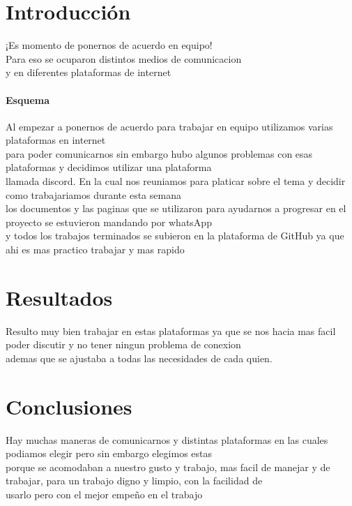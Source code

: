 \documentclass[12pt]{article}
\begin{document}
\maketitle


\section{Introducción}
¡Es momento de ponernos de acuerdo en equipo!\\
Para eso se ocuparon distintos medios de comunicacion\\
y en diferentes plataformas de internet\\

\paragraph{Esquema}
Al empezar a ponernos de acuerdo para trabajar en equipo utilizamos varias plataformas en internet\\
para poder comunicarnos sin embargo hubo algunos problemas con esas plataformas y decidimos utilizar una plataforma\\
llamada discord. En la cual nos reuniamos para platicar sobre el tema y decidir como trabajariamos durante esta semana\\
los documentos y las paginas que se utilizaron para ayudarnos a progresar en el proyecto se estuvieron mandando por whatsApp\\
y todos los trabajos terminados se subieron en la plataforma de GitHub ya que ahi es mas practico trabajar y mas rapido\\

\section{Resultados} \label{resultados}
Resulto muy bien trabajar en estas plataformas ya que se nos hacia mas facil poder discutir y no tener ningun problema de conexion\\ ademas que se ajustaba a todas las necesidades de cada quien.\\

\section{Conclusiones} \label{conclusiones}
Hay muchas maneras de comunicarnos y distintas plataformas en las cuales podiamos elegir pero sin embargo elegimos estas\\
porque se acomodaban a nuestro gusto y trabajo, mas facil de manejar y de trabajar, para un trabajo digno y limpio, con la facilidad de\\ usarlo pero con el mejor empeño en el trabajo\\



\end{document}
